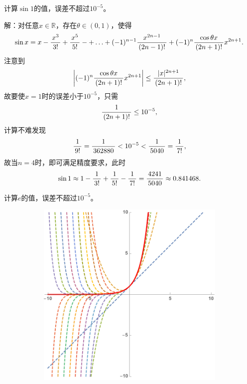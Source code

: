 
\egz 计算$\sin 1$的值，误差不超过$10^{-5}$。

解：对任意$x\in\mathbb{R}$，存在$\theta\in(0,1)$，使得
$$\sin x=x-\df{x^3}{3!}+\df{x^5}{5!}-+\ldots
+(-1)^{n-1}\df{x^{2n-1}}{(2n-1)!}
+(-1)^{n}\df{\cos\theta x}{(2n+1)!}x^{2n+1}.$$
注意到
$$\left|(-1)^{n}\df{\cos\theta x}{(2n+1)!}x^{2n+1}\right|
\leq\df{|x|^{2n+1}}{(2n+1)!},$$
故要使$x=1$时的误差小于$10^{-5}$，只需
$$\df1{(2n+1)!}\leq 10^{-5},$$
计算不难发现
$$\df1{9!}=\df1{362880}<10^{-5}<\df1{5040}=\df1{7!},$$
故当$n=4$时，即可满足精度要求，此时
$$\sin 1\approx 1-\df1{3!}+\df1{5!}-\df1{7!}=\df{4241}{5040}\approx 0.841468.$$
\fin

\egz 计算$e$的值，误差不超过$10^{-5}$。
	
\begin{figure}[h]
	\centering
	\begin{subfigure}[t]{0.3\textwidth}
		\centering
		\includegraphics[width=\textwidth]{./Images/Ch03/ex10.pdf}
	\end{subfigure}
	\begin{subfigure}[t]{0.3\textwidth}
		\centering

\end{subfigure}
\end{figure}

